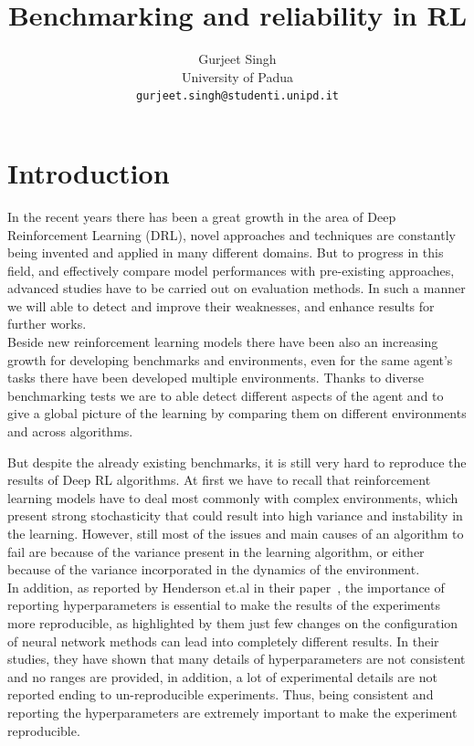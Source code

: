 \documentclass{article}
\title{Benchmarking and reliability in RL}
\author{Gurjeet Singh\\
  University of Padua\\
  \texttt{gurjeet.singh@studenti.unipd.it}
}
\begin{document}
\maketitle

\begin{abstract}
\end{abstract}

\section{Introduction}
In the recent years there has been a great growth in the area of Deep Reinforcement Learning (DRL), novel approaches and techniques are constantly being invented and applied in many different domains.
But to progress in this field, and effectively compare model performances with pre-existing approaches, advanced studies have to be carried out on evaluation methods.  In such a manner we will able to detect and improve their weaknesses, and enhance results for further works.\\
Beside new reinforcement learning models there have been also an increasing growth for developing benchmarks and environments, even for the same agent's tasks there have been developed multiple environments.
Thanks to diverse benchmarking tests we are to able detect different aspects of the agent and to give a global picture of the learning by comparing them on different environments and across algorithms.

But despite the already existing benchmarks, it is still very hard to reproduce the results of Deep RL algorithms. At first we have to recall that reinforcement learning models have to deal most commonly with complex environments, which present strong stochasticity that could result into high variance and instability in the learning. However, still most of the issues and main causes of an algorithm to fail are because of the variance present in the learning algorithm, or either because of the variance incorporated in the dynamics of the environment.\\
In addition, as reported by Henderson et.al in their paper~\cite{DRL01}, the importance of reporting hyperparameters is essential to make the results of the experiments more reproducible, as highlighted by them just few changes on the configuration of neural network methods can lead into completely different results. In their studies, they have shown that many details of hyperparameters are not consistent and no ranges are provided, in addition, a lot of experimental details are not reported ending to un-reproducible experiments. Thus, being consistent and reporting the hyperparameters are extremely important to make the experiment reproducible.
\end{document}
